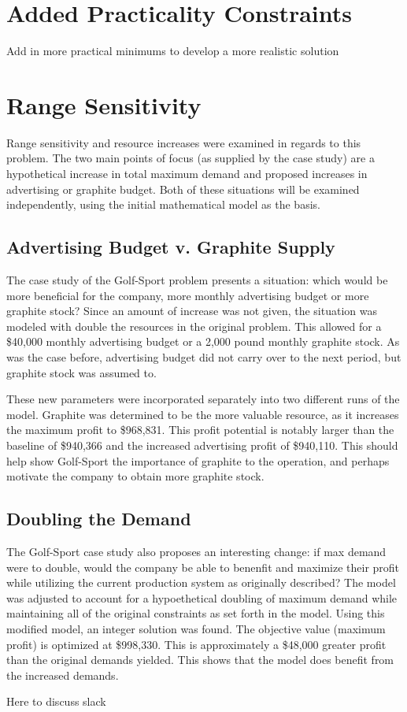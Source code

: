 \documentclass{article}
\begin{document}
\section{Added Practicality Constraints}
Add in more practical minimums to develop a more realistic solution %
\section{Range Sensitivity}
Range sensitivity and resource increases were examined in regards to this problem.  The two main points of focus (as supplied by the case study) are a hypothetical increase in total maximum demand and proposed increases in advertising or graphite budget.  Both of these situations 
will be examined independently, using the initial mathematical model as the basis.
\subsection{Advertising Budget v. Graphite Supply}
The case study of the Golf-Sport problem presents a situation:  which would be more beneficial for the company, more monthly advertising budget or more graphite stock?  Since an amount of increase was not given, the situation was modeled with double the resources in the original problem.  
This allowed for a \$40,000 monthly advertising budget or a 2,000 pound monthly graphite stock.  As was the case before, advertising budget did not carry over to the next period, but graphite stock was assumed to.\par
These new parameters were incorporated separately into two different runs of the model.  Graphite was determined to be the more valuable resource, as it increases the maximum profit to \$968,831.  This profit potential is notably larger than the baseline of \$940,366 and the increased advertising 
profit of \$940,110.  This should help show Golf-Sport the importance of graphite to the operation, and perhaps motivate the company to obtain more graphite stock.
\subsection{Doubling the Demand}
The Golf-Sport case study also proposes an interesting change:  if max demand were to double, would the company be able to benenfit and maximize their profit while utilizing the current production system as originally described?  The model was adjusted to account for a hypoethetical doubling of maximum demand while maintaining all of the original constraints as set forth in the model.  
Using this modified model, an integer solution was found.  The objective value (maximum profit) is optimized at \$998,330.  This is approximately a \$48,000 greater profit than the original demands yielded.  This shows that the model does benefit from the increased demands.
\par
Here to discuss slack %
\end{document}
